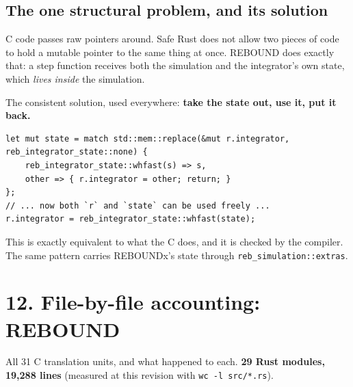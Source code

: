 \documentclass[11pt]{article}
\begin{document}
\subsection{The one structural problem, and its solution}

C code passes raw pointers around. Safe Rust does not allow two pieces of code to hold a mutable pointer to the same thing at once. REBOUND does exactly that: a step function receives both the simulation and the integrator's own state, which \emph{lives inside} the simulation.

The consistent solution, used everywhere: \textbf{take the state out, use it, put it back.}

\begin{lstlisting}
let mut state = match std::mem::replace(&mut r.integrator, reb_integrator_state::none) {
    reb_integrator_state::whfast(s) => s,
    other => { r.integrator = other; return; }
};
// ... now both `r` and `state` can be used freely ...
r.integrator = reb_integrator_state::whfast(state);
\end{lstlisting}

This is exactly equivalent to what the C does, and it is checked by the compiler. The same pattern carries REBOUNDx's state through \texttt{reb\_simulation::extras}.

\section{12. File-by-file accounting: REBOUND}

All 31 C translation units, and what happened to each. \textbf{29 Rust modules, 19,288 lines} (measured at this revision with \texttt{wc -l src/*.rs}).
\end{document}
